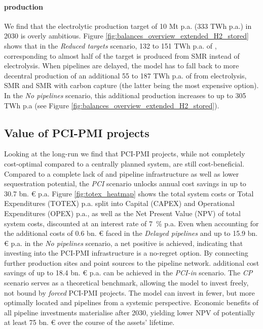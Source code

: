 \documentclass[final,5p,times,twocolumn,sort&compress]{elsarticle}
\begin{document}
\paragraph{ production} 
We find that the electrolytic  production target of 10 Mt p.a. (333 TWh p.a.) in 2030 is overly ambitious. Figure \ref{fig:balances_overview_extended_H2_stored} shows that in the \textit{Reduced targets} scenario, 132 to 151 TWh p.a. of , corresponding to almost half of the target is produced from SMR instead of electrolysis. When pipelines are delayed, the model has to fall back to more decentral  production of an additional 55 to 187 TWh p.a. of  from electrolysis, SMR and SMR with carbon capture (the latter being the most expensive option). In the \textit{No pipelines} scenario, this additional  production increases to up to 305 TWh p.a (see Figure \ref{fig:balances_overview_extended_H2_stored}).

\subsection{Value of PCI-PMI projects}
\label{sec:value_of_pcipmi_projects}
Looking at the long-run we find that PCI-PMI projects, while not completely cost-optimal compared to a centrally planned system, are still cost-beneficial. Compared to a complete lack of  and  pipeline infrastructure as well as lower  sequestration potential, the \textit{PCI} scenario unlocks annual cost savings in up to 30.7 bn. \euro{} p.a. Figure \ref{fig:totex_heatmap} shows the total system costs or Total Expenditures (TOTEX) p.a. split into Capital (CAPEX) and Operational Expenditures (OPEX) p.a., as well as the Net Present Value (NPV) of total system costs, discounted at an interest rate of \SI{7}{\percent} p.a.
Even when accounting for the additional costs of 0.6 bn. \euro{} faced in the \textit{Delayed pipelines} and up to 15.9 bn. \euro{} p.a. in the \textit{No pipelines} scenario, a net positive is achieved, indicating that investing into the PCI-PMI infrastructure is a no-regret option. By connecting further  production sites and  point sources to the pipeline network. additional cost savings of up to 18.4 bn. \euro{} p.a. can be achieved in the \textit{PCI-in} scenario. The \textit{CP} scenario serves as a theoretical benchmark, allowing the model to invest freely, not bound by \textit{forced} PCI-PMI projects. The model can invest in fewer, but more optimally located  and  pipelines from a systemic perspective. Economic benefits of all pipeline investments materialise after 2030, yielding lower NPV of potentially at least 75 bn. \euro{} over the course of the assets' lifetime. 
\end{document}
